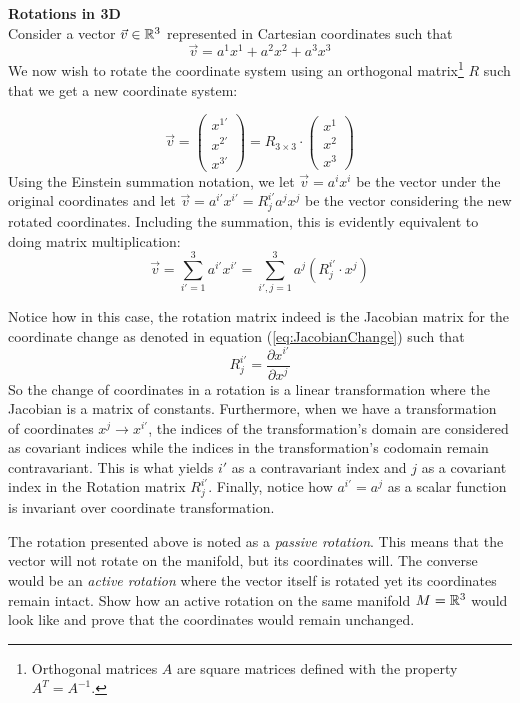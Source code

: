 \documentclass{article}
\begin{document}
 		\begin{exmp}
 			\textbf{Rotations in 3D}\\
 			Consider a vector $\vec{v} \in \mathbb{R}^3$ represented in Cartesian coordinates such that
 			$$ \vec{v} = a^1 x^1 + a^2 x^2 + a^3 x^3$$
 			We now wish to rotate the coordinate system using an orthogonal matrix\footnote{Orthogonal matrices $A$ are square matrices defined with the property $A^T = A^{-1}$.} $R$ such that we get a new coordinate system:
 			
 			$$ \vec{v} = \begin{pmatrix}
 				x^{1'} \\
 				x^{2'} \\
 				x^{3'}
 			\end{pmatrix} = R_{3\times3} \cdot \begin{pmatrix}
 				x^1 \\
 				x^2 \\
 				x^3
 			\end{pmatrix}$$
 			Using the Einstein summation notation, we let $\vec{v} = a^i x^i$ be the vector under the original coordinates and let $\vec{v} = a^{i'}x^{i'} = R_j^{i'} a^j x^j$ be the vector considering the new rotated coordinates. Including the summation, this is evidently equivalent to doing matrix multiplication:
 			$$ \vec{v} = \sum_{i'=1}^3 a^{i'}x^{i'}=\sum_{i', j = 1}^3 a^j \left(R_j^{i'}\cdot x^j\right) $$
 			
 			\pagebreak \noindent
 			Notice how in this case, the rotation matrix indeed is the Jacobian matrix for the coordinate change as denoted in equation (\ref{eq:JacobianChange}) such that
 			$$ R_{j}^{i'} = \frac{\partial x^{i'}}{\partial x^j}$$
 			So the change of coordinates in a rotation is a linear transformation where the Jacobian is a matrix of constants. 
 			Furthermore, when we have a transformation of coordinates $x^{j} \to x^{i'}$, the indices of the transformation's domain are considered as covariant indices while the indices in the transformation's codomain remain contravariant. This is what yields $i'$ as a contravariant index and $j$ as a covariant index in the Rotation matrix $R_j^{i'}$. Finally, notice how $a^{i'} = a^{j}$ as a scalar function is invariant over coordinate transformation.
 		\end{exmp}
 		\begin{exe}
 			The rotation presented above is noted as a \textit{passive rotation}. This means that the vector will not rotate on the manifold, but its coordinates will. The converse would be an \textit{active rotation} where the vector itself is rotated yet its coordinates remain intact.
 			Show how an active rotation on the same manifold $M=\mathbb{R}^3$ would look like and prove that the coordinates would remain unchanged.
 		\end{exe}
\end{document}
